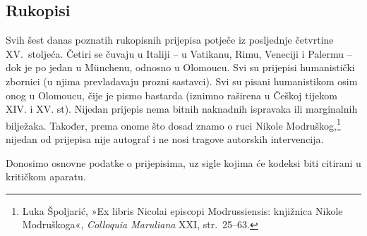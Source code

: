 \documentclass[a5paper,twoside]{article}
\begin{document}
\subsection{Rukopisi}

Svih šest danas poznatih rukopisnih prijepisa potječe iz posljednje četvrtine XV.~stoljeća. Četiri se čuvaju u Italiji – u Vatikanu, Rimu, Veneciji i Palermu – dok je po jedan u Münchenu, odnosno u Olomoucu. Svi su prijepisi humanistički zbornici (u njima prevladavaju prozni sastavci). Svi su pisani humanistikom osim onog u Olomoucu, čije je pismo bastarda (iznimno raširena u Češkoj tijekom XIV. i XV. st). Nijedan prijepis nema bitnih naknadnih ispravaka ili marginalnih bilježaka. Također, prema onome što dosad znamo o ruci Nikole Modruškog,\footnote{Luka Špoljarić, »Ex libris Nicolai episcopi Modrussiensis: knjižnica Nikole Modruškoga«, \textit{Colloquia Maruliana} XXI, str.~25–63.} nijedan od prijepisa nije autograf i ne nosi tragove autorskih intervencija.

Donosimo osnovne podatke o prijepisima, uz sigle kojima će kodeksi biti citirani u kritičkom aparatu.
\end{document}
